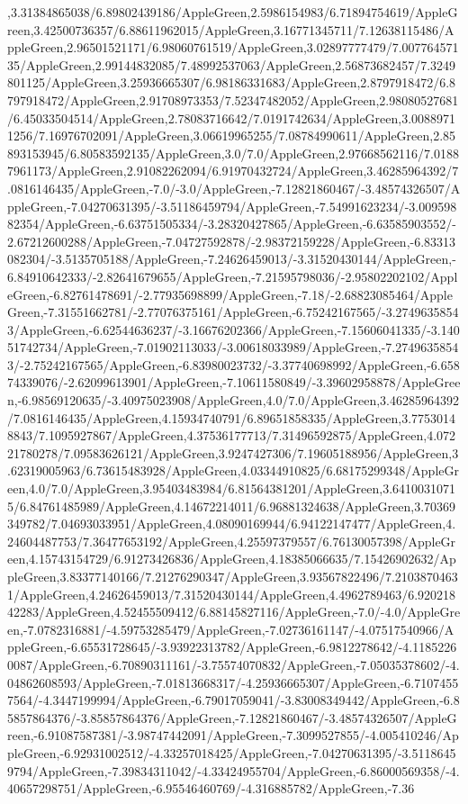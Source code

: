 {\begin{tikzternal}
,3.31384865038/6.89802439186/AppleGreen,2.5986154983/6.71894754619/AppleGreen,3.42500736357/6.88611962015/AppleGreen,3.16771345711/7.12638115486/AppleGreen,2.96501521171/6.98060761519/AppleGreen,3.02897777479/7.00776457135/AppleGreen,2.99144832085/7.48992537063/AppleGreen,2.56873682457/7.3249801125/AppleGreen,3.25936665307/6.98186331683/AppleGreen,2.8797918472/6.8797918472/AppleGreen,2.91708973353/7.52347482052/AppleGreen,2.98080527681/6.45033504514/AppleGreen,2.78083716642/7.0191742634/AppleGreen,3.00889711256/7.16976702091/AppleGreen,3.06619965255/7.08784990611/AppleGreen,2.85893153945/6.80583592135/AppleGreen,3.0/7.0/AppleGreen,2.97668562116/7.01887961173/AppleGreen,2.91082262094/6.91970432724/AppleGreen,3.46285964392/7.0816146435/AppleGreen,-7.0/-3.0/AppleGreen,-7.12821860467/-3.48574326507/AppleGreen,-7.04270631395/-3.51186459794/AppleGreen,-7.54991623234/-3.00959882354/AppleGreen,-6.63751505334/-3.28320427865/AppleGreen,-6.63585903552/-2.67212600288/AppleGreen,-7.04727592878/-2.98372159228/AppleGreen,-6.83313082304/-3.5135705188/AppleGreen,-7.24626459013/-3.31520430144/AppleGreen,-6.84910642333/-2.82641679655/AppleGreen,-7.21595798036/-2.95802202102/AppleGreen,-6.82761478691/-2.77935698899/AppleGreen,-7.18/-2.68823085464/AppleGreen,-7.31551662781/-2.77076375161/AppleGreen,-6.75242167565/-3.27496358543/AppleGreen,-6.62544636237/-3.16676202366/AppleGreen,-7.15606041335/-3.14051742734/AppleGreen,-7.01902113033/-3.00618033989/AppleGreen,-7.27496358543/-2.75242167565/AppleGreen,-6.83980023732/-3.37740698992/AppleGreen,-6.65874339076/-2.62099613901/AppleGreen,-7.10611580849/-3.39602958878/AppleGreen,-6.98569120635/-3.40975023908/AppleGreen,4.0/7.0/AppleGreen,3.46285964392/7.0816146435/AppleGreen,4.15934740791/6.89651858335/AppleGreen,3.77530148843/7.1095927867/AppleGreen,4.37536177713/7.31496592875/AppleGreen,4.07221780278/7.09583626121/AppleGreen,3.9247427306/7.19605188956/AppleGreen,3.62319005963/6.73615483928/AppleGreen,4.03344910825/6.68175299348/AppleGreen,4.0/7.0/AppleGreen,3.95403483984/6.81564381201/AppleGreen,3.64100310715/6.84761485989/AppleGreen,4.14672214011/6.96881324638/AppleGreen,3.70369349782/7.04693033951/AppleGreen,4.08090169944/6.94122147477/AppleGreen,4.24604487753/7.36477653192/AppleGreen,4.25597379557/6.76130057398/AppleGreen,4.15743154729/6.91273426836/AppleGreen,4.18385066635/7.15426902632/AppleGreen,3.83377140166/7.21276290347/AppleGreen,3.93567822496/7.21038704631/AppleGreen,4.24626459013/7.31520430144/AppleGreen,4.4962789463/6.92021842283/AppleGreen,4.52455509412/6.88145827116/AppleGreen,-7.0/-4.0/AppleGreen,-7.0782316881/-4.59753285479/AppleGreen,-7.02736161147/-4.07517540966/AppleGreen,-6.65531728645/-3.93922313782/AppleGreen,-6.9812278642/-4.11852260087/AppleGreen,-6.70890311161/-3.75574070832/AppleGreen,-7.05035378602/-4.04862608593/AppleGreen,-7.01813668317/-4.25936665307/AppleGreen,-6.71074557564/-4.3447199994/AppleGreen,-6.79017059041/-3.83008349442/AppleGreen,-6.85857864376/-3.85857864376/AppleGreen,-7.12821860467/-3.48574326507/AppleGreen,-6.91087587381/-3.98747442091/AppleGreen,-7.3099527855/-4.005410246/AppleGreen,-6.92931002512/-4.33257018425/AppleGreen,-7.04270631395/-3.51186459794/AppleGreen,-7.39834311042/-4.33424955704/AppleGreen,-6.86000569358/-4.40657298751/AppleGreen,-6.95546460769/-4.316885782/AppleGreen,-7.36
\end{tikzternal}}
